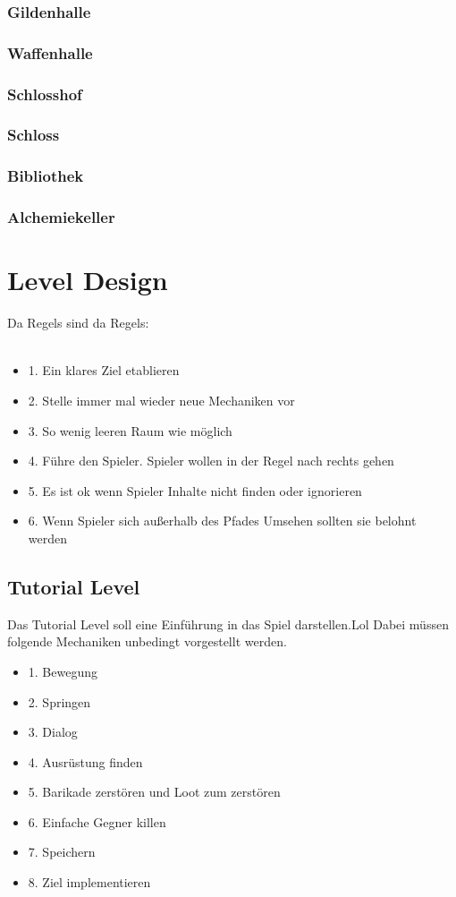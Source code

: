 \documentclass[envcountsame,envcountchap deutsch]{i-studis}
\begin{document}
\subsection{Gildenhalle}
\subsection{Waffenhalle}

\subsection{Schlosshof}

\subsection{Schloss}

\subsection{Bibliothek}
\subsection{Alchemiekeller}

\chapter{Level Design}
Da Regels sind da Regels: \\\\
\begin{itemize}
	\item 1. Ein klares Ziel etablieren
	\item 2. Stelle immer mal wieder neue Mechaniken vor
	\item 3. So wenig leeren Raum wie möglich
	\item 4. Führe den Spieler. Spieler wollen in der Regel nach rechts gehen 
	\item 5. Es ist ok wenn Spieler Inhalte nicht finden oder ignorieren 
	\item 6. Wenn Spieler sich außerhalb des Pfades Umsehen sollten sie belohnt werden 
\end{itemize}

\pagebreak
\section{Tutorial Level}
Das Tutorial Level soll eine Einführung in das Spiel darstellen.Lol
Dabei müssen folgende Mechaniken unbedingt vorgestellt werden.
\begin{itemize}
	\item 1. Bewegung
	\item 2. Springen
	\item 3. Dialog
	\item 4. Ausrüstung finden
	\item 5. Barikade zerstören und Loot zum zerstören
	\item 6. Einfache Gegner killen
	\item 7. Speichern
	\item 8. Ziel implementieren
\end{itemize}
\end{document}
